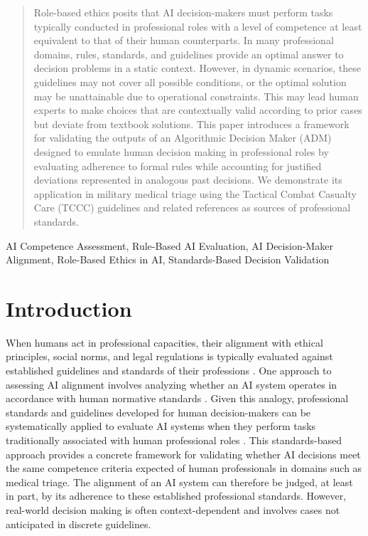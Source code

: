 \documentclass[conference]{IEEEtran}
\begin{document}
\begin{abstract}
Role-based ethics posits that AI decision-makers must perform tasks typically conducted in professional roles with a level of competence at least equivalent to that of their human counterparts. In many professional domains, rules, standards, and guidelines provide an optimal answer to decision problems in a static context. However, in dynamic scenarios, these guidelines may not cover all possible conditions, or the optimal solution may be unattainable due to operational constraints. This may lead human experts to make choices that are contextually valid according to prior cases but deviate from textbook solutions. This paper introduces a framework for validating the outputs of an Algorithmic Decision Maker (ADM) designed to emulate human decision making in professional roles by evaluating adherence to formal rules while accounting for justified deviations represented in analogous past decisions. We demonstrate its application in military medical triage using the Tactical Combat Casualty Care (TCCC) guidelines and related references as sources of professional standards.
\end{abstract}

\begin{IEEEkeywords}
AI Competence Assessment, Rule-Based AI Evaluation, AI Decision-Maker Alignment, Role-Based Ethics in AI, Standards-Based Decision Validation
\end{IEEEkeywords}

\section{Introduction}
\label{sec:introduction}
When humans act in professional capacities, their alignment with ethical principles, social norms, and legal regulations is typically evaluated against established guidelines and standards of their professions \cite{badcott_professional_2011}. One approach to assessing AI alignment involves analyzing whether an AI system operates in accordance with human normative standards \cite{wallach_moral_2009}. Given this analogy, professional standards and guidelines developed for human decision-makers can be systematically applied to evaluate AI systems when they perform tasks traditionally associated with human professional roles \cite{awad_computational_2022}. This standards-based approach provides a concrete framework for validating whether AI decisions meet the same competence criteria expected of human professionals in domains such as medical triage. The alignment of an AI system can therefore be judged, at least in part, by its adherence to these established professional standards. However, real-world decision making is often context-dependent and involves cases not anticipated in discrete guidelines.
\end{document}
